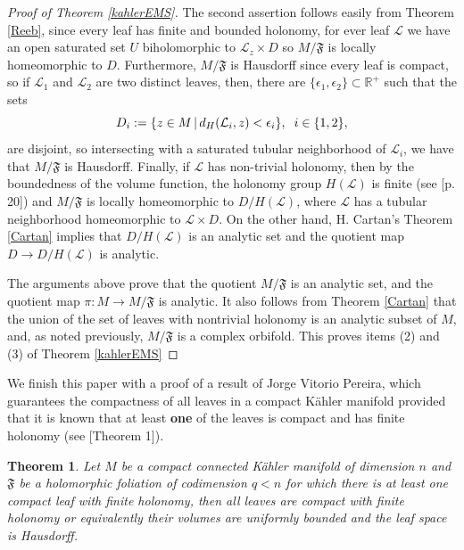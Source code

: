 \documentclass[12pt,twoside,a4paper]{report}
\newtheorem{theorem}{Theorem}[section]
\newcommand{\re}{\ensuremath{\mathbb R }}
\begin{document}
\begin{proof}[Proof of Theorem \ref{kahlerEMS}]
  The second assertion follows easily from Theorem \ref{Reeb}, since every leaf has finite and bounded holonomy, for ever leaf $\mathcal{L}$ we have an open saturated set $U$ biholomorphic to $\mathcal{L}_z\times D$ so $M/\mathfrak{F}$ is locally homeomorphic to $D$.
Furthermore, $M/\mathfrak{F}$ is Hausdorff since every leaf is compact, so if $\mathcal{L}_1$ and $\mathcal{L}_2$ are two distinct leaves, then, there are $\lbrace\epsilon_1,\epsilon_2\rbrace\subset\re^+$ such that the sets
\[
  D_i:=\lbrace z\in M\,|\, d_H(\mathcal{L}_i,z)<\epsilon_i\rbrace,\hspace{0.2cm} i\in\lbrace1,2\rbrace,
\]
\noindent are disjoint, so intersecting with a saturated tubular neighborhood
of $\mathcal{L}_{i}$, we have that $M/\mathfrak{F}$ is Hausdorff. Finally, if
$\mathcal{L}$ has non-trivial holonomy, then by the boundedness of the volume function, the
holonomy group $H(\mathcal{L})$ is finite (see \cite{EMS} [p. 20]) and
$M/\mathfrak{F}$ is locally homeomorphic to $D/H(\mathcal{L})$, where
$\mathcal{L}$ has a tubular neighborhood  homeomorphic to $\mathcal{L}\times D$.
On the other hand, H. Cartan's Theorem \ref{Cartan} implies that $D/H(\mathcal{L})$ is an analytic set and the quotient map $D\to{D/H(\mathcal{L})}$ is analytic.

The arguments above prove
that the quotient $M/\mathfrak{F}$ is an analytic set, and the quotient map
$\pi:M\to{M/\mathfrak{F}}$ is analytic. It also follows from Theorem \ref{Cartan} that the union of the set of leaves with nontrivial holonomy is an analytic subset of $M$, and, as noted previously, $M/\mathfrak{F}$ is a complex orbifold.
This proves items (2) and (3) of Theorem \ref{kahlerEMS}
\end{proof}
We finish this paper with a proof of a result of Jorge Vitorio Pereira, which guarantees the compactness of all leaves in a compact Kähler manifold provided that it is known that at least \textbf{one} of the leaves is compact and has finite holonomy (see \cite{Pereira}[Theorem 1]).
\begin{theorem}\label{compact-leaf}
Let $M$ be a compact connected Kähler manifold of dimension $n$ and $\mathfrak{F}$ be a holomorphic foliation of codimension $q<n$ for which there is at least one compact leaf with finite holonomy, then all leaves are compact with finite holonomy or equivalently their volumes are uniformly bounded and the leaf space is Hausdorff.
\end{theorem}
\end{document}
